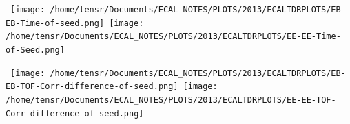 \begin{center}
\centering
\mbox{
\texttt{[image: /home/tensr/Documents/ECAL\_NOTES/PLOTS/2013/ECALTDRPLOTS/EB-EB-Time-of-seed.png]}\quad
\texttt{[image: /home/tensr/Documents/ECAL\_NOTES/PLOTS/2013/ECALTDRPLOTS/EE-EE-Time-of-Seed.png]}}
\label{fig:ZeeTimePerformance}
\end{center}

\begin{center}
\centering
\mbox{
\texttt{[image: /home/tensr/Documents/ECAL\_NOTES/PLOTS/2013/ECALTDRPLOTS/EB-EB-TOF-Corr-difference-of-seed.png]}\quad
\texttt{[image: /home/tensr/Documents/ECAL\_NOTES/PLOTS/2013/ECALTDRPLOTS/EE-EE-TOF-Corr-difference-of-seed.png]}}
\label{fig:ZeeTimePerformance}
\end{center}

\begin{center}
  \begin{tabular}{|c|c|c|c|c|c|}
   \hline
   \hline
  \end{tabular}
   \label{table1} %
\end{center}

\label{ECAL Timing Calibration_chapter}
